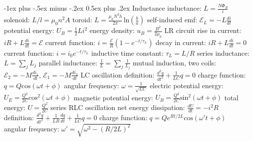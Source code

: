 \documentclass[10pt,landscape]{article}
\makeatletter
\renewcommand{\subsection}{\@startsection{subsection}{2}{0mm}%
                                {-1ex plus -.5ex minus -.2ex}%
                                {0.5ex plus .2ex}%
                                {\normalfont\normalsize\bfseries}}
\newcommand{\spc}{\hspace*{1em}}
\makeatother
\begin{document}
\begin{multicols*}{3}
\subsection{Inductance}
inductance: $L=\frac{N\Phi _B}{i}$
\newline
\spc solenoid: $L/l=\mu _0n^2A$
\newline
\spc toroid: $L=\frac{\mu _0N^2h}{2\pi} \, \mathrm{ln}(\frac{b}{a})$
\newline
self-induced emf: $\mathscr{E} _L=-L\frac{di}{dt}$
\newline
potential energy: $U_B=\frac{1}{2}Li^2$
\newline
energy density: $u_B=\frac{B^2}{2\mu _0}$
\newline \newline
LR circuit
\newline
\spc rise in current: $iR+L\frac{di}{dt}=\mathscr{E} $
\newline
\spc\spc current function: $i=\frac{\mathscr{E} }{R}(1-e^{-t/\tau _L})$
\newline
\spc decay in current: $iR+L\frac{di}{dt}=0$
\newline
\spc\spc current function: $i=i_0e^{-t/\tau _L}$
\newline
\spc inductive time constant: $\tau _L=L/R$
\newline \newline
series inductance: $L=\sum _j L_j$
\newline
parallel inductance: $\frac{1}{L}=\sum _j \frac{1}{L_j}$
\newline
mutual induction, two coils: 
\newline
\spc $\mathscr{E} _2=-M\frac{di_1}{dt}$, $\mathscr{E} _1=-M\frac{di_2}{dt}$
\newline \newline
LC oscillation
\newline
\spc definition: $\frac{d^2q}{dt^2}+\frac{1}{LC}q=0$
\newline
\spc\spc charge function: $q=Q\mathrm{cos}(\omega t+\phi)$
\newline
\spc angular frequency: $\omega =\frac{1}{\sqrt{LC}}$
\newline
\spc electric potential energy: $U_E=\frac{Q^2}{2C}\mathrm{cos}^2(\omega t+\phi)$
\newline
\spc magnetic potential energy: $U_B=\frac{Q^2}{2C}\mathrm{sin}^2(\omega t+\phi)$
\newline
\spc total energy: $U=\frac{Q^2}{2C}$
\newline \newline
series RLC oscillation
\newline
\spc net energy dissipation: $\frac{dU}{dt}=-i^2R$
\newline
\spc definition: $\frac{d^2q}{dt^2}+\frac{1}{LR}\frac{dq}{dt}+\frac{1}{LC}q=0$
\newline
\spc \spc charge function: $q=Qe^{Rt/2L}\mathrm{cos}(\omega 't+\phi)$
\newline
\spc angular frequency: $\omega '=\sqrt{\omega ^2-(R/2L)^2}$


\end{multicols*}
\end{document}
